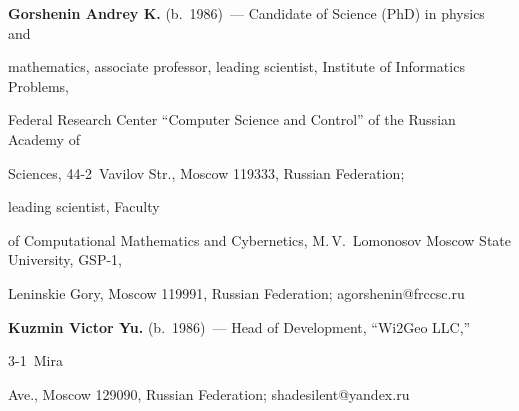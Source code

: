 \noindent

\textbf{Gorshenin Andrey K.} (b.\ 1986)~--- Candidate of Science (PhD) in physics and

mathematics, associate professor, leading scientist, Institute of Informatics Problems,

Federal Research Center ``Computer Science and Control'' of the Russian Academy of

Sciences, 44-2~Vavilov Str., Moscow 119333, Russian Federation;  

leading scientist, Faculty

of Computational Mathematics and Cybernetics, M.\,V.~Lomonosov Moscow State University, GSP-1,

Leninskie Gory, Moscow 119991, Russian Federation; \mbox{agorshenin@frccsc.ru}



\vspace*{3pt}



\noindent

\textbf{Kuzmin Victor Yu.} (b.\ 1986)~--- Head of Development, ``Wi2Geo LLC,'' 

3-1~Mira

Ave., Moscow 129090, Russian Federation; \mbox{shadesilent@yandex.ru}







\label{end\stat}



\renewcommand{\bibname}{\protect\rm Литература}  

